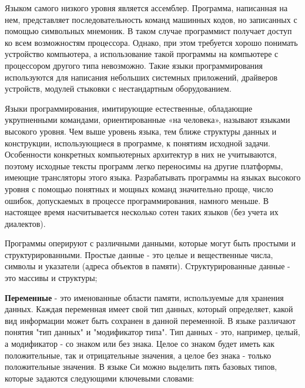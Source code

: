 \documentclass[14pt,a4paper]{article} %
\begin{document}
Языком самого низкого уровня является ассемблер. Программа, написанная на нем, представляет последовательность команд машинных кодов, но записанных с помощью символьных мнемоник. В таком случае программист получает доступ ко всем возможностям процессора. Однако, при этом требуется хорошо понимать устройство компьютера, а использование такой программы на компьютере с процессором другого типа невозможно. Такие языки программирования используются для написания небольших системных приложений, драйверов устройств, модулей стыковки с нестандартным оборудованием.

Языки программирования, имитирующие естественные, обладающие укрупненными командами, ориентированные «на человека», называют языками высокого уровня. Чем выше уровень языка, тем ближе структуры данных и конструкции, использующиеся в программе, к понятиям исходной задачи. Особенности конкретных компьютерных архитектур в них не учитываются, поэтому исходные тексты программ легко переносимы на другие платформы, имеющие трансляторы этого языка. Разрабатывать программы на языках высокого уровня с помощью понятных и мощных команд значительно проще, число ошибок, допускаемых в процессе программирования, намного меньше. В настоящее время насчитывается несколько сотен таких языков (без учета их диалектов).

Программы оперируют с различными данными, которые могут быть простыми и структурированными. Простые данные - это целые и вещественные числа, символы и указатели (адреса объектов в памяти). Структурированные данные - это массивы и структуры;

{\bfseries Переменные} - это именованные области памяти, используемые для хранения данных. Каждая переменная имеет свой тип данных, который определяет, какой вид информации может быть сохранен в данной переменной.
В языке различают понятия "тип данных" и "модификатор типа". Тип данных - это, например, целый, а модификатор - со знаком или без знака. Целое со знаком будет иметь как положительные, так и отрицательные значения, а целое без знака - только положительные значения. В языке Си можно выделить пять базовых типов, которые задаются следующими ключевыми словами:
\end{document}
